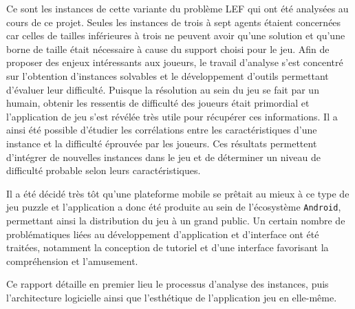 \documentclass[../main.tex]{subfiles}
\begin{document}
    Ce sont les instances de cette variante du problème LEF qui ont été analysées au cours de ce projet. Seules les instances de trois à sept agents étaient concernées car celles de tailles inférieures à trois ne peuvent avoir qu'une solution et qu'une borne de taille était nécessaire à cause du support choisi pour le jeu. Afin de proposer des enjeux intéressants aux joueurs, le travail d'analyse s'est concentré sur l'obtention d'instances solvables et le développement d'outils permettant d'évaluer leur difficulté. Puisque la résolution au sein du jeu se fait  par un humain, obtenir les ressentis de difficulté des joueurs était primordial et l'application de jeu s'est révélée très utile pour récupérer ces informations. Il a ainsi été possible d'étudier les corrélations entre les caractéristiques d'une instance et la difficulté éprouvée par les joueurs. Ces résultats permettent d'intégrer de nouvelles instances dans le jeu et de déterminer un niveau de difficulté probable selon leurs caractéristiques.
    	
	Il a été décidé très tôt qu'une plateforme mobile se prêtait au mieux à ce type de jeu puzzle et l'application a donc été produite au sein de l'écosystème \texttt{Android}, permettant ainsi la distribution du jeu à un grand public. Un certain nombre de problématiques liées au développement d'application et d'interface ont été traitées, notamment la conception de tutoriel et d'une interface favorisant la compréhension et l'amusement.
	
	Ce rapport détaille en premier lieu le processus d'analyse des instances, puis l'architecture logicielle ainsi que l'esthétique de l'application jeu en elle-même. 
\end{document}
